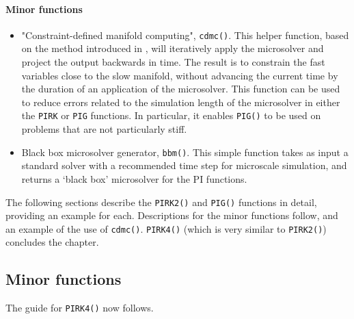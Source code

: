 \paragraph{Minor functions}
\begin{itemize}
\item "Constraint-defined manifold computing", \verb|cdmc()|. This helper function, based on the method introduced in \cite{GearKevrekidis05}, will iteratively apply the microsolver and project the output backwards in time. The result is to constrain the fast variables close to the slow manifold, without advancing the current time by the duration of an application of the microsolver. This function can be used to reduce errors related to the simulation length of the microsolver in either the \verb|PIRK| or \verb|PIG| functions. In particular, it enables \verb|PIG()| to be used on problems that are not particularly stiff.
\item Black box microsolver generator, \verb|bbm()|. This simple function takes as input a standard solver with a recommended time step for microscale simulation, and returns a `black box' microsolver for the PI functions.
\end{itemize}

The following sections describe the \verb|PIRK2()| and \verb|PIG()| functions in detail, providing an example for each. Descriptions for the minor functions follow, and an example of the use of \verb|cdmc()|. \verb|PIRK4()| (which is very similar to \verb|PIRK2()|) concludes the chapter.






\subsection{Minor functions}
\label{sec:extras}





The guide for \verb|PIRK4()| now follows.






